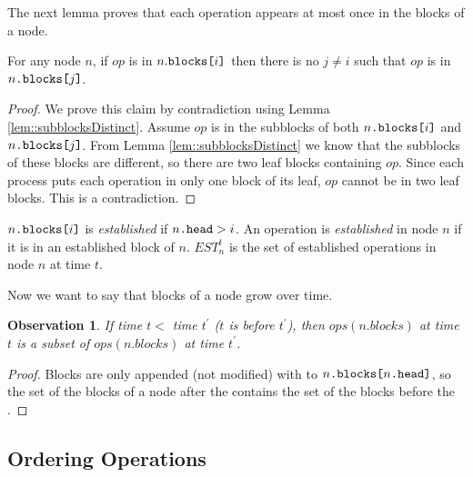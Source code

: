 \documentclass[acmsmall,nonacm,anonymous]{acmart}
\renewcommand{\it}[1]{\textit{#1}}
\newcommand{\nf}[1]{{\normalfont{\texttt{#1}}}}
\newtheorem{observation}{Observation}
\begin{document}
The next lemma proves that each operation appears at most once in the blocks of a node.
\begin{lemma}\label{lem::noDuplicates}
For any node $n$, if $op$ is in $n.\nf{blocks[}i\nf{]}$ then there is no $j\neq i$ such that $op$ is in $n\nf{.blocks[}j\nf{]}$.
\end{lemma}
\begin{proof}
We prove this claim by contradiction using Lemma \ref{lem::subblocksDistinct}. Assume $op$ is in the subblocks of both $n\nf{.blocks[}i\nf{]}$ and $n\nf{.blocks[}j\nf{]}$. From Lemma \ref{lem::subblocksDistinct} we know that the subblocks of these blocks are different, so there are two leaf blocks containing $op$. Since each process puts each operation in only one block of its leaf, $op$ cannot be in two leaf blocks. This is a contradiction.
\end{proof}

\begin{definition}
$n\nf{.blocks[}i\nf{]}$ is \emph{established} if $n\nf{.head}>i$. An operation is \it{established} in node $n$ if it is in an established block of $n$. $EST^t_n$ is the set of established operations in node $n$ at time $t$.
\end{definition}

Now we want to say that blocks of a node grow over time.
\begin{observation}\label{lem::blocksOrder}
  If  time $t<$ time $t^\prime$ ($t$ is before $t^\prime$), then $ops(n.blocks)$ at time $t$ is a subset of $ops(n.blocks)$ at time $t^\prime$.
\end{observation}
\begin{proof}
Blocks are only appended (not modified) with \nf{CAS} to $n\nf{.blocks[}n\nf{.head]}$, so the set of the blocks of a node after the \nf{CAS} contains the set of the blocks before the \nf{CAS}.
\end{proof}



\subsection{Ordering Operations}
\end{document}
